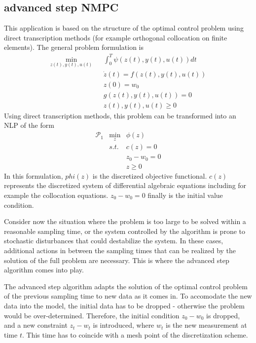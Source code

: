 \documentclass[a4paper]{article}
\begin{document}
\subsection{advanced step NMPC}
This application is based on the structure of the optimal control problem using direct transcription methods (for example orthogonal collocation on finite elements). The general problem formulation is
\begin{equation}
  \begin{array}{ccc}
    \min\limits_{z(t),y(t),u(t)}&& \int_0^T\psi(z(t),y(t),u(t))dt\\
    &&\dot{z}(t) = f(z(t),y(t),u(t))\\
    &&z(0) = w_0\\
    &&g(z(t),y(t),u(t)) = 0\\
    &&z(t),y(t),u(t)\geq 0
  \end{array}
\end{equation}
Using direct transcription methods, this problem can be transformed into an NLP of the form
\begin{equation}
  \label{discretized_OCP}
  \begin{array}{ccc}
    \mathcal{P}_1 &\min\limits_z& \phi(z)\\
    &s.t.& c(z) = 0\\
    && z_0-w_0 = 0\\
    && z\geq 0
  \end{array}
\end{equation}
In this formulation, $phi(z)$ is the discretized objective functional. $c(z)$ represents the discretized system of differential algebraic equations including for example the collocation equations. $z_0-w_0=0$ finally is the initial value condition. 

Consider now the situation where the problem is too large to be solved within a reasonable sampling time, or the system controlled by the algorithm is prone to stochastic disturbances that could destabilize the system. In these cases, additional actions in between the sampling times that can be realized by the solution of the full problem are necessary. This is where the advanced step algorithm comes into play. 

The advanced step algorithm adapts the solution of the optimal control problem of the previous sampling time to new data as it comes in. To accomodate the new data into the model, the initial data has to be dropped - otherwise the problem would be over-determined. Therefore, the initial condition $z_0-w_0$ is dropped, and a new constraint $z_t-w_t$ is introduced, where $w_t$ is the new measurement at time $t$. This time has to coincide with a mesh point of the discretization scheme. 
\end{document}
